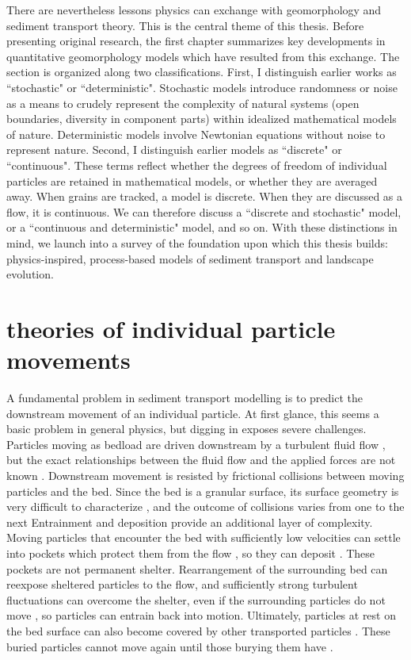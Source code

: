There are nevertheless lessons physics can exchange with geomorphology and sediment transport theory. This is the central theme of this thesis. Before presenting original research, the first chapter summarizes key developments in quantitative geomorphology models which have resulted from this exchange. The section is organized along two classifications. First, I distinguish earlier works as ``stochastic" or ``deterministic". Stochastic models introduce randomness or noise as a means to crudely represent the complexity of natural systems (open boundaries, diversity in component parts) within idealized mathematical models of nature. Deterministic models involve Newtonian equations without noise to represent nature. Second, I distinguish earlier models as ``discrete" or ``continuous". These terms reflect whether the degrees of freedom of individual particles are retained in mathematical models, or whether they are averaged away. When grains are tracked, a model is discrete. When they are discussed as a flow, it is continuous. We can therefore discuss a ``discrete and stochastic" model, or a ``continuous and deterministic" model, and so on.
With these distinctions in mind, we launch into a survey of the foundation upon which this thesis builds: physics-inspired, process-based models of sediment transport and landscape evolution.

\section{theories of individual particle movements}

A fundamental problem in sediment transport modelling is to predict the downstream movement of an individual particle.
At first glance, this seems a basic problem in general physics, but digging in exposes severe challenges.
Particles moving as bedload are driven downstream by a turbulent fluid flow \citep{}, but the exact relationships between the fluid flow and the applied forces are not known \citep{Furbish1997}.
Downstream movement is resisted by frictional collisions between moving particles and the bed.
Since the bed is a granular surface, its surface geometry is very difficult to characterize \citep{Gordon1972}, and the outcome of collisions varies from one to the next \citep{Sekine1992}
Entrainment and deposition provide an additional layer of complexity.
Moving particles that encounter the bed with sufficiently low velocities can settle into pockets which protect them from the flow \citep{Miller1966}, so they can deposit \citep{Charru2004}.
These pockets are not permanent shelter.
Rearrangement of the surrounding bed can reexpose sheltered particles to the flow, and sufficiently strong turbulent fluctuations can overcome the shelter, even if the surrounding particles do not move \citep{Valyrakis2012,Celik2014}, so particles can entrain back into motion.
Ultimately, particles at rest on the bed surface can also become covered by other transported particles \citep{Yang1972}. These buried particles cannot move again until those burying them have \citep{Nakagawa1981}.

